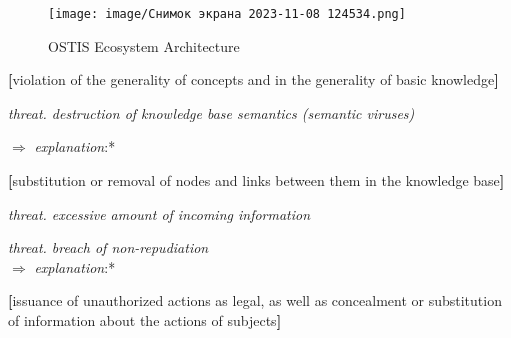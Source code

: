 \documentclass{article}
\date{}
\begin{document}
\begin{figure}
    \centering
    \texttt{[image: image/Снимок экрана 2023-11-08 124534.png]}
    \caption{OSTIS Ecosystem Architecture}
    \label{fig:enter-label}
\end{figure}
\begin{multicols}{2}
\begin{description}[leftmargin=!, labelwidth=1cm, itemsep=-1.5mm]

\begin{description}[leftmargin=!, labelwidth=1.2cm, itemsep=-1.5mm]
   \item \textbf{[}violation of the generality of concepts and
in the generality of basic knowledge\textbf{]}
\end{description}
 \vspace{-0.2cm} \item[$\supset$] \textit{threat. destruction of knowledge base semantics
(semantic viruses)}

   \vspace{-0.2cm}  $\Rightarrow$  \hspace{0.5cm} \textit{explanation}:* 
   \par
   \begin{description}[leftmargin=!, labelwidth=0.9cm, itemsep=-1.5mm]
  \item \vspace{-0.3cm}  \textbf{[}substitution or removal of nodes and links
between them in the knowledge base\textbf{]}
\end{description}


   \vspace{-0.2cm} \item[$\supset$] \textit {threat. excessive amount of incoming information} \\
    \vspace{-0.4cm}\item[$\supset$] \textit {threat. breach of non-repudiation} \\
   \vspace{0.1cm} \hspace{-0.23cm}  $\Rightarrow$  \hspace{0.5cm} \textit{explanation}:* 
  \begin{description}[leftmargin=!, labelwidth=0.9cm, itemsep=-1.5mm]
   \item \vspace{-0.4cm}\textbf{[}issuance of unauthorized actions as legal,
as well as concealment or substitution of
information about the actions of subjects\textbf{]}
\end{description}
    

\end{description}
\end{multicols}
\end{document}
